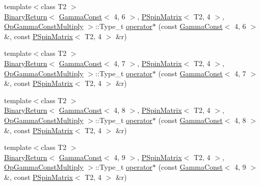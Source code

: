 \begin{DoxyCompactItemize}
\item 
{\footnotesize template$<$class T2 $>$ }\\\mbox{\hyperlink{structENSEM_1_1BinaryReturn}{Binary\+Return}}$<$ \mbox{\hyperlink{classENSEM_1_1GammaConst}{Gamma\+Const}}$<$ 4, 6 $>$, \mbox{\hyperlink{classENSEM_1_1PSpinMatrix}{P\+Spin\+Matrix}}$<$ T2, 4 $>$, \mbox{\hyperlink{structENSEM_1_1OpGammaConstMultiply}{Op\+Gamma\+Const\+Multiply}} $>$\+::Type\+\_\+t \mbox{\hyperlink{group__primspinmatrix_ga6159ef586816bd93e368fd7d18f601ad}{operator$\ast$}} (const \mbox{\hyperlink{classENSEM_1_1GammaConst}{Gamma\+Const}}$<$ 4, 6 $>$ \&, const \mbox{\hyperlink{classENSEM_1_1PSpinMatrix}{P\+Spin\+Matrix}}$<$ T2, 4 $>$ \&r)
\item 
{\footnotesize template$<$class T2 $>$ }\\\mbox{\hyperlink{structENSEM_1_1BinaryReturn}{Binary\+Return}}$<$ \mbox{\hyperlink{classENSEM_1_1GammaConst}{Gamma\+Const}}$<$ 4, 7 $>$, \mbox{\hyperlink{classENSEM_1_1PSpinMatrix}{P\+Spin\+Matrix}}$<$ T2, 4 $>$, \mbox{\hyperlink{structENSEM_1_1OpGammaConstMultiply}{Op\+Gamma\+Const\+Multiply}} $>$\+::Type\+\_\+t \mbox{\hyperlink{group__primspinmatrix_ga05f36a58daa404d7245006a9dd7323bb}{operator$\ast$}} (const \mbox{\hyperlink{classENSEM_1_1GammaConst}{Gamma\+Const}}$<$ 4, 7 $>$ \&, const \mbox{\hyperlink{classENSEM_1_1PSpinMatrix}{P\+Spin\+Matrix}}$<$ T2, 4 $>$ \&r)
\item 
{\footnotesize template$<$class T2 $>$ }\\\mbox{\hyperlink{structENSEM_1_1BinaryReturn}{Binary\+Return}}$<$ \mbox{\hyperlink{classENSEM_1_1GammaConst}{Gamma\+Const}}$<$ 4, 8 $>$, \mbox{\hyperlink{classENSEM_1_1PSpinMatrix}{P\+Spin\+Matrix}}$<$ T2, 4 $>$, \mbox{\hyperlink{structENSEM_1_1OpGammaConstMultiply}{Op\+Gamma\+Const\+Multiply}} $>$\+::Type\+\_\+t \mbox{\hyperlink{group__primspinmatrix_ga14cbf328548b8d7ab484cf88d9190adf}{operator$\ast$}} (const \mbox{\hyperlink{classENSEM_1_1GammaConst}{Gamma\+Const}}$<$ 4, 8 $>$ \&, const \mbox{\hyperlink{classENSEM_1_1PSpinMatrix}{P\+Spin\+Matrix}}$<$ T2, 4 $>$ \&r)
\item 
{\footnotesize template$<$class T2 $>$ }\\\mbox{\hyperlink{structENSEM_1_1BinaryReturn}{Binary\+Return}}$<$ \mbox{\hyperlink{classENSEM_1_1GammaConst}{Gamma\+Const}}$<$ 4, 9 $>$, \mbox{\hyperlink{classENSEM_1_1PSpinMatrix}{P\+Spin\+Matrix}}$<$ T2, 4 $>$, \mbox{\hyperlink{structENSEM_1_1OpGammaConstMultiply}{Op\+Gamma\+Const\+Multiply}} $>$\+::Type\+\_\+t \mbox{\hyperlink{group__primspinmatrix_gaa9f2a3db77b04450fdbceeca87443364}{operator$\ast$}} (const \mbox{\hyperlink{classENSEM_1_1GammaConst}{Gamma\+Const}}$<$ 4, 9 $>$ \&, const \mbox{\hyperlink{classENSEM_1_1PSpinMatrix}{P\+Spin\+Matrix}}$<$ T2, 4 $>$ \&r)

\end{DoxyCompactItemize}
